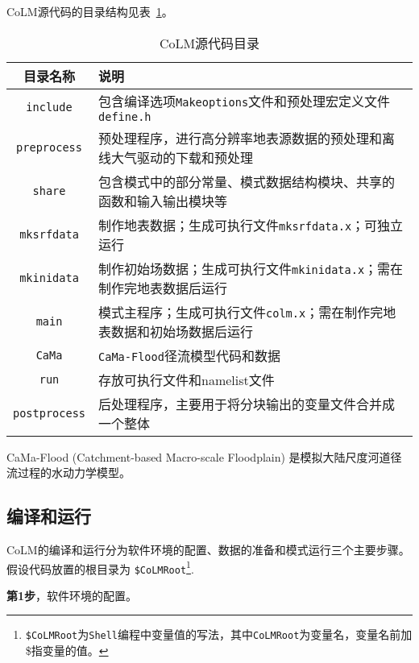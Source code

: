 \documentclass[a4paper,12pt,twoside]{article}
\begin{document}
CoLM源代码的目录结构见表~\ref{subdirectories}。
\begin{table}[!htbp]\small
\caption{CoLM源代码目录} \label{subdirectories}
\centering \renewcommand{\arraystretch}{1.5}
\begin{threeparttable}
\begin{tabular}{cp{}}
\toprule
\textbf{目录名称} & \textbf{说明} \\
\midrule
\texttt{include} & 包含编译选项\texttt{Makeoptions}文件和预处理宏定义文件\texttt{define.h} \\
\texttt{preprocess} & 预处理程序，进行高分辨率地表源数据的预处理和离线大气驱动的下载和预处理 \\
\texttt{share} & 包含模式中的部分常量、模式数据结构模块、共享的函数和输入输出模块等 \\
\texttt{mksrfdata} & 制作地表数据；生成可执行文件\texttt{mksrfdata.x}；可独立运行 \\
\texttt{mkinidata} & 制作初始场数据；生成可执行文件\texttt{mkinidata.x}；需在制作完地表数据后运行\\
\texttt{main} & 模式主程序；生成可执行文件\texttt{colm.x}；需在制作完地表数据和初始场数据后运行\\
\texttt{CaMa} & \texttt{CaMa-Flood}径流模型代码和数据 \\
\texttt{run} & 存放可执行文件和namelist文件 \\
\texttt{postprocess} & 后处理程序，主要用于将分块输出的变量文件合并成一个整体 \\
\bottomrule
\end{tabular}
\begin{tablenotes}
\footnotesize
\item[1] CaMa-Flood (Catchment-based Macro-scale Floodplain) 是模拟大陆尺度河道径流过程的水动力学模型。
\end{tablenotes} 
\end{threeparttable}
\end{table}

\subsection{编译和运行}\label{comprun}

CoLM的编译和运行分为软件环境的配置、数据的准备和模式运行三个主要步骤。假设代码放置的根目录为 \texttt{\$CoLMRoot}\footnote{\texttt{\$CoLMRoot}为\texttt{Shell}编程中变量值的写法，其中\texttt{CoLMRoot}为变量名，变量名前加\$指变量的值。}.

\textbf{第1步}，软件环境的配置。
\end{document}
